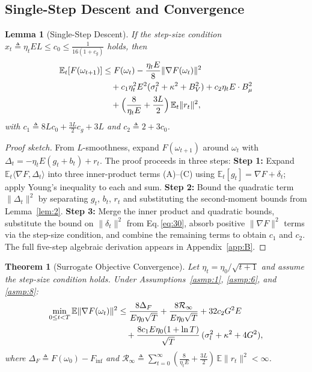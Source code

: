 \documentclass[journal]{IEEEtran}
\newtheorem{theorem}{Theorem}
\newtheorem{lemma}{Lemma}
\begin{document}
\subsection{Single-Step Descent and Convergence}

\begin{lemma}[Single-Step Descent]\label{lem:3}
  If the step-size condition \(x_t \triangleq \eta_t E L \le c_0 \le \frac{1}{16(1+c_g)}\) holds, then
  \begin{align}
    \mathbb E_t[F(\omega_{t+1})]
    &\le F(\omega_t) - \frac{\eta_t E}{8}\|\nabla F(\omega_t)\|^2 \notag\\
    &\quad + c_1\eta_t^2 E^2(\sigma_l^2 + \kappa^2 + B_V^2)
       + c_2\eta_t E \cdot B_\mu^2 \notag\\
    &\quad + \Bigl(\frac{8}{\eta_t E} + \frac{3L}{2}\Bigr)\,\mathbb E_t\|r_t\|^2,
    \label{eq:33}
  \end{align}
  with \(c_1 \triangleq 8L c_0 + \frac{3L}{2}c_g + 3L\) and \(c_2 \triangleq 2 + 3c_0\).
\end{lemma}

\begin{proof}[Proof sketch]
  From \(L\)-smoothness, expand \(F(\omega_{t+1})\) around \(\omega_t\) with \(\Delta_t = -\eta_t E(g_t + b_t) + r_t\).
  The proof proceeds in three steps:
  \textbf{Step 1:} Expand \(\mathbb E_t\langle\nabla F, \Delta_t\rangle\) into three inner-product terms (A)--(C) using \(\mathbb E_t[g_t] = \nabla F + \delta_t\); apply Young's inequality to each and sum.
  \textbf{Step 2:} Bound the quadratic term \(\|\Delta_t\|^2\) by separating \(g_t\), \(b_t\), \(r_t\) and substituting the second-moment bounds from Lemma~\ref{lem:2}.
  \textbf{Step 3:} Merge the inner product and quadratic bounds, substitute the bound on \(\|\delta_t\|^2\) from Eq.\,\eqref{eq:30}, absorb positive \(\|\nabla F\|^2\) terms via the step-size condition, and combine the remaining terms to obtain \(c_1\) and \(c_2\).
  The full five-step algebraic derivation appears in Appendix~\ref{app:B}.
\end{proof}

\begin{theorem}[Surrogate Objective Convergence]\label{thm:1}
  Let \(\eta_t = \eta_0 / \sqrt{t+1}\) and assume the step-size condition holds.
  Under Assumptions~\ref{asmp:1}, \ref{asmp:6}, and \ref{asmp:8}:
  \begin{align}
    \min_{0 \le t < T} \mathbb E\|\nabla F(\omega_t)\|^2
    &\le \frac{8\Delta_F}{E\eta_0\sqrt{T}}
       + \frac{8\mathcal R_\infty}{E\eta_0\sqrt{T}}
       + 32 c_2 G^2 E \notag\\
    &\quad + \frac{8c_1 E\eta_0(1 + \ln T)}{\sqrt{T}}\,
          (\sigma_l^2 + \kappa^2 + 4G^2),
    \label{eq:36}
  \end{align}
  where \(\Delta_F \triangleq F(\omega_0) - F_{\inf}\) and
  \(\mathcal R_\infty \triangleq \sum_{t=0}^{\infty}(\frac{8}{\eta_t E} + \frac{3L}{2})\,\mathbb E\|r_t\|^2 < \infty\).
\end{theorem}
\end{document}
